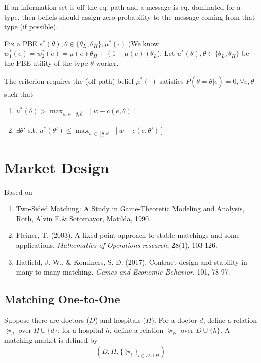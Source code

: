 \documentclass[11pt]{elegantbook}
\begin{document}
\begin{definition}
    \normalfont
    If an information set is off the eq. path and a message is eq. dominated for a type, then beliefs should assign zero probability to the message coming from that type (if possible).
\end{definition}

Fix a PBE $e^*(\theta), \theta\in\{\theta_L,\theta_H\}, \mu^*(\cdot)$ (We know $w_1^*(e)=w_2^*(e)=\mu(e)\theta_H+(1-\mu(e))\theta_L$). Let $u^*(\theta),\theta\in\{\theta_L,\theta_H\}$ be the PBE utility of the type $\theta$ worker.

The criterion requires the (off-path) belief $\mu^*(\cdot)$ satisfies $P(\tilde{\theta}=\theta|e)=0,\forall e,\theta$ such that
\begin{enumerate}
    \item $u^*(\theta)>\max_{w\in[\underline{\theta},\overline{\theta}]}[w-c(e,\theta)]$
    \item $\exists \theta'$ s.t. $u^*(\theta')\leq \max_{w\in[\underline{\theta},\overline{\theta}]}[w-c(e,\theta')]$
\end{enumerate}









\chapter{Market Design}
Based on
\begin{enumerate}[$\circ$]
    \item Two-Sided Matching: A Study in Game-Theoretic Modeling and Analysis, Roth, Alvin E.\& Sotomayor, Matilda, 1990.
    \item Fleiner, T. (2003). A fixed-point approach to stable matchings and some applications. \textit{Mathematics of Operations research}, 28(1), 103-126.
    \item Hatfield, J. W., \& Kominers, S. D. (2017). Contract design and stability in many-to-many matching. \textit{Games and Economic Behavior}, 101, 78-97.
\end{enumerate}
\section{Matching One-to-One}
Suppose there are doctors ($D$) and hospitals ($H$). For a doctor $d$, define a relation $\succeq_d$ over $H\cup\{d\}$; for a hospital $h$, define a relation $\succeq_h$ over $D\cup\{h\}$. A matching market is defined by $$\left(D,H,\{\succeq_i\}_{i\in D\cup H}\right)$$
\end{document}
